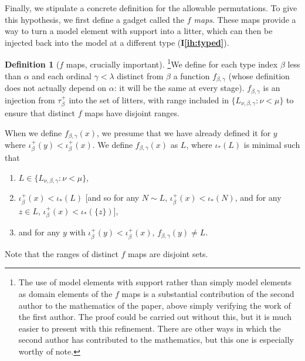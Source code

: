 \documentclass{article}
\theoremstyle{definition}
\newtheorem{definition}[theorem]{Definition}
\theoremstyle{remark}
\newcommand{\ihref}[1]{(\textbf{I\ref{#1}})}
\begin{document}
{Finally, we stipulate a concrete definition for the allowable permutations.
To give this hypothesis, we first define a gadget called the \emph{$f$ maps}.
These maps provide a way to turn a model element with support into a litter, which can then be injected back into the model at a different type \ihref{ih:typed}.

\begin{definition}[$f$ maps, crucially important]\footnote{The use of model elements with support rather than simply model elements as domain elements of the $f$ maps is a substantial contribution of the second author to the mathematics of the paper, above simply verifying the work of the first author.  The proof could be carried out without this, but it is much easier to present with this refinement.  There are other ways in which the second author has contributed to the mathematics, but this one is especially worthy of note.}\label{def:f_map}
  We define for each type index $\beta$ less than $\alpha$ and each ordinal $\gamma<\lambda$ distinct from $\beta$ a function $f_{\beta,\gamma}$ (whose definition does not actually depend on $\alpha$:  it will be the same at every stage).  $f_{\beta,\gamma}$ is an injection from $\tau_\beta^+$ into the set of litters, with range included in  $\{L_{\nu,\beta,\gamma}:\nu < \mu\}$ to ensure that distinct $f$ maps have disjoint ranges.




  When we define $f_{\beta,\gamma}(x)$, we presume that we have already defined it for $y$ where $\iota_\beta^+(y) < \iota_\beta^+(x)$.
  We define $f_{\beta,\gamma}(x)$ as $L$, where $\iota_*(L)$ is minimal such that

  \begin{enumerate}
    \item $L \in  \{L_{\nu,\beta,\gamma}:\nu < \mu\}$,

    \item  $\iota^+_\beta(x) <\iota_*(L)$ [and so for any $N \sim L$, $\iota^+_\beta(x) <\iota_*(N)$, and for any $z \in L$, $\iota^+_\beta(x) < \iota_*(\{z\})$],

    \item and for any $y$ with $\iota_\beta^+(y) < \iota_\beta^+(x)$, $f_{\beta,\gamma}(y) \neq L$.

  \end{enumerate}

\end{definition}

\noindent Note that the ranges of distinct $f$ maps are disjoint sets.

}
\end{document}
